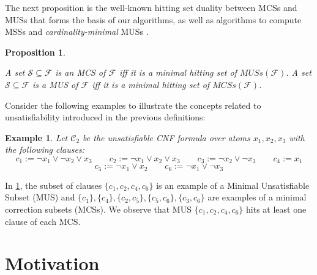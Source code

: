 \documentclass[twoside,11pt]{article}
\newcommand\m[1]{\mathcal{#1}}
\newtheorem{proposition}[propo]{Proposition}
\newtheorem{example}{Example}
\newcommand\formula{\ensuremath{\m{F} }\xspace}
\newcommand\formulac{\ensuremath{\m{C} }\xspace}
\newcommand\muses[1]{\ensuremath{\mathit{MUSs}(#1)}\xspace}
\newcommand\mcses[1]{\ensuremath{\mathit{MCSs}(#1)}\xspace}
\begin{document}
The next proposition is the well-known hitting set duality \cite{DBLP:journals/jar/LiffitonS08,ai/Reiter87}  between MCSs and MUSs that forms the basis of our algorithms, as well as algorithms to compute MSSs \cite{DBLP:conf/sat/DaviesB13} and \emph{cardinality-minimal} MUSs \cite{ignatiev2015smallest}.

\begin{proposition}\label{prop:MCS-MUS-hittingset}
	   
A set  $\m{S} \subseteq \formula$ is an MCS of $ \formula$ iff  it is a \emph{minimal hitting set} of \muses{\formula}.
A set  $\m{S} \subseteq \formula$ is a MUS of $ \formula$ iff  it is a \emph{minimal hitting set} of \mcses{\formula}.
\end{proposition}

Consider the following examples to illustrate the concepts related to unsatisfiability introduced in the previous definitions:
\begin{example}\label{example:unsat}
	Let $\formulac_2$ be the unsatisfiable CNF formula over atoms $x_1, x_2, x_3$ with the following clauses:
	\[ c_1 := \lnot x_1 \vee \lnot x_2 \vee x_3 \qquad  c_2 := \lnot x_1 \vee  x_2 \vee x_3  \qquad c_3 := \lnot x_2 \vee \lnot x_3 \qquad  c_4 := x_1\]
	\[ c_5 := \lnot x_1 \vee  x_2 \qquad  c_6 := \lnot x_1 \vee  \lnot x_3 \]

\end{example}
In \cref{example:unsat}, the subset of clauses $\{c_1, c_2, c_4, c_6\}$ is an example of a Minimal Unsatisfiable Subset (MUS) and $ \{c_1\},\{c_4\}, \{c_2,c_5\},\{c_5, c_6\}, \{c_3, c_6\}$ are examples of a minimal correction subsets (MCSs). We observe that MUS $\{c_1, c_2, c_4, c_6\}$ hits at least one clause of each MCS. 



\section{Motivation}\label{sec:motivation}
\end{document}
